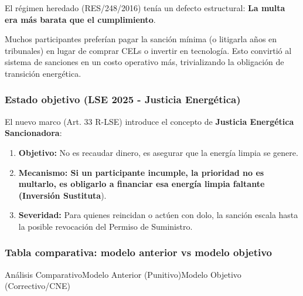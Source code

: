 \documentclass{cel}
\begin{document}
El régimen heredado (RES/248/2016) tenía un defecto estructural: \textbf{La multa era más barata que el cumplimiento}.

Muchos participantes preferían pagar la sanción mínima (o litigarla años en tribunales) en lugar de comprar CELs o invertir en tecnología. Esto convirtió al sistema de sanciones en un \textquotedbl{}costo operativo\textquotedbl{} más, trivializando la obligación de transición energética.


\subsubsection{Estado objetivo (LSE 2025 - Justicia Energética)}
\nopagebreak

El nuevo marco (Art. 33 R-LSE) introduce el concepto de \textbf{Justicia Energética Sancionadora}:


\begin{enumerate}
\item \textbf{Objetivo:} No es recaudar dinero, es asegurar que la energía limpia se genere.
\item \textbf{Mecanismo: \textbf{ Si un participante incumple, la prioridad no es multarlo, es obligarlo a financiar esa energía limpia faltante (}Inversión Sustituta}).
\item \textbf{Severidad:} Para quienes reincidan o actúen con dolo, la sanción escala hasta la posible revocación del Permiso de Suministro.

\end{enumerate}
\vspace{0.4cm}
\subsubsection{Tabla comparativa: modelo anterior vs modelo objetivo}
\nopagebreak

\vspace{0.3cm}
\begin{tablaParadigmaV2}{Análisis Comparativo}{Modelo Anterior (Punitivo)}{Modelo Objetivo (Correctivo/CNE)}
\end{tablaParadigmaV2}
\end{document}
